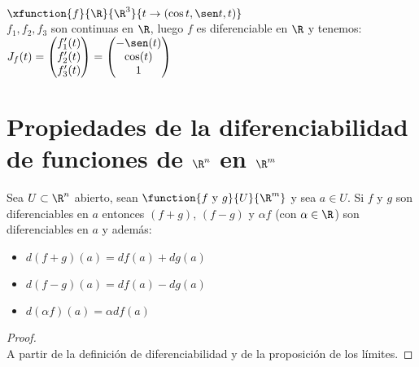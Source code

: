 	\begin{ejem} $\xfunction{f}{\R}{\R^3}{t\to (\cos t,\sen t, t)}$\\
	$f_1,f_2,f_3$ son continuas en $\R$, luego $f$ es diferenciable en $\R$ y tenemos:\\
	$J_f(t)=\begin{pmatrix}f_1'(t)\\f_2'(t)\\f_3'(t)\end{pmatrix}= \begin{pmatrix}-\sen(t)\\\cos(t)\\1\end{pmatrix}$
	\end{ejem}
	
	\section{Propiedades de la diferenciabilidad de funciones de $\R^n$ en $\R^m$}	
	
	\begin{proposicion} Sea $U\subset \R^n$ abierto, sean $\function{f\mathrm{\ y\ }g}{U}{\R^m}$ y sea $a\in U$. Si $f$ y $g$ son diferenciables en $a$ entonces $(f+g)$, $(f-g)$ y $\alpha f$ (con $\alpha \in \R$) son diferenciables en $a$ y además:\begin{itemize}
	\item $d(f+g)(a)=df(a)+dg(a)$
	\item $d(f-g)(a)=df(a)-dg(a)$
	\item $d(\alpha f)(a)=\alpha df(a)$
	\end{itemize}
	\begin{proof}\ \\
	A partir de la definición de diferenciabilidad y de la proposición de los límites.	
	\end{proof}
	\end{proposicion}
	

